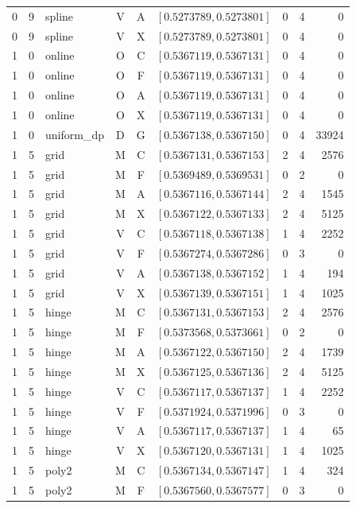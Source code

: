 \begin{longtable}{r r l c c l r r r}
0 & 9 & spline & V & A & $[0.5273789,0.5273801]$ & 0 & 4 & 0 \\
0 & 9 & spline & V & X & $[0.5273789,0.5273801]$ & 0 & 4 & 0 \\
1 & 0 & online & O & C & $[0.5367119,0.5367131]$ & 0 & 4 & 0 \\
1 & 0 & online & O & F & $[0.5367119,0.5367131]$ & 0 & 4 & 0 \\
1 & 0 & online & O & A & $[0.5367119,0.5367131]$ & 0 & 4 & 0 \\
1 & 0 & online & O & X & $[0.5367119,0.5367131]$ & 0 & 4 & 0 \\
1 & 0 & uniform\_dp & D & G & $[0.5367138,0.5367150]$ & 0 & 4 & 33924 \\
1 & 5 & grid & M & C & $[0.5367131,0.5367153]$ & 2 & 4 & 2576 \\
1 & 5 & grid & M & F & $[0.5369489,0.5369531]$ & 0 & 2 & 0 \\
1 & 5 & grid & M & A & $[0.5367116,0.5367144]$ & 2 & 4 & 1545 \\
1 & 5 & grid & M & X & $[0.5367122,0.5367133]$ & 2 & 4 & 5125 \\
1 & 5 & grid & V & C & $[0.5367118,0.5367138]$ & 1 & 4 & 2252 \\
1 & 5 & grid & V & F & $[0.5367274,0.5367286]$ & 0 & 3 & 0 \\
1 & 5 & grid & V & A & $[0.5367138,0.5367152]$ & 1 & 4 & 194 \\
1 & 5 & grid & V & X & $[0.5367139,0.5367151]$ & 1 & 4 & 1025 \\
1 & 5 & hinge & M & C & $[0.5367131,0.5367153]$ & 2 & 4 & 2576 \\
1 & 5 & hinge & M & F & $[0.5373568,0.5373661]$ & 0 & 2 & 0 \\
1 & 5 & hinge & M & A & $[0.5367122,0.5367150]$ & 2 & 4 & 1739 \\
1 & 5 & hinge & M & X & $[0.5367125,0.5367136]$ & 2 & 4 & 5125 \\
1 & 5 & hinge & V & C & $[0.5367117,0.5367137]$ & 1 & 4 & 2252 \\
1 & 5 & hinge & V & F & $[0.5371924,0.5371996]$ & 0 & 3 & 0 \\
1 & 5 & hinge & V & A & $[0.5367117,0.5367137]$ & 1 & 4 & 65 \\
1 & 5 & hinge & V & X & $[0.5367120,0.5367131]$ & 1 & 4 & 1025 \\
1 & 5 & poly2 & M & C & $[0.5367134,0.5367147]$ & 1 & 4 & 324 \\
1 & 5 & poly2 & M & F & $[0.5367560,0.5367577]$ & 0 & 3 & 0 \\

\end{longtable}
